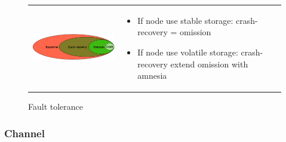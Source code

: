\begin{figure}[!ht]
    \begin{tabular}{m{8cm}m{8cm}}
        \includegraphics[width=8cm]{img/fault-tolerance.png}
        &
        \begin{itemize}
            \item If node use stable storage: crash-recovery = omission
            \item If node use volatile storage: crash-recovery extend omission
                with amnesia
        \end{itemize}
    \end{tabular}

    \caption{Fault tolerance}
\end{figure}
\FloatBarrier{}

\subsubsection{Channel}

